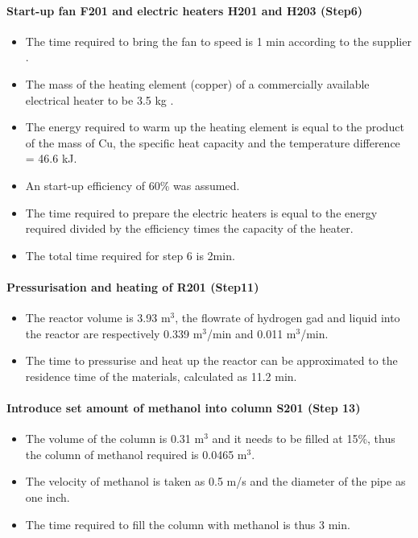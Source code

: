 \paragraph{Start-up fan F201 and electric heaters H201 and H203 (Step6)}
\begin{itemize}
        \item The time required to bring the fan to speed is 1 min according to the supplier \cite{twin_city_fan_companies_ltd_application_2000}.
        \item The mass of the heating element (copper) of a commercially available electrical heater to be 3.5 kg \cite{wattco_flanged_nodate}.
        \item The energy required to warm up the heating element is equal to the product of the mass of Cu, the specific heat capacity and the temperature difference = 46.6 kJ.
        \item An start-up efficiency of 60\% was assumed.
        \item The time required to prepare the electric heaters is equal to the energy required divided by the efficiency times the capacity of the heater. 
        \item The total time required for step 6 is 2min.
    \end{itemize}
    
\paragraph{Pressurisation and heating of R201 (Step11)}
\begin{itemize}
    \item The reactor volume is 3.93 m$^3$, the flowrate of hydrogen gad and liquid into the reactor are respectively 0.339 m$^3$/min and 0.011  m$^3$/min.
    \item The time to pressurise and heat up the reactor can be approximated to the residence time of the materials, calculated as 11.2 min.
\end{itemize}

\paragraph{Introduce set amount of methanol into column S201 (Step 13)}
\begin{itemize}
    \item The volume of the column is 0.31 m$^3$ and it needs to be filled at 15\%, thus the column of methanol required is 0.0465 m$^3$.
    \item The velocity of methanol is taken as 0.5 m/s and the diameter of the pipe as one inch.
    \item The time required to fill the column with methanol is thus 3 min.
\end{itemize}


